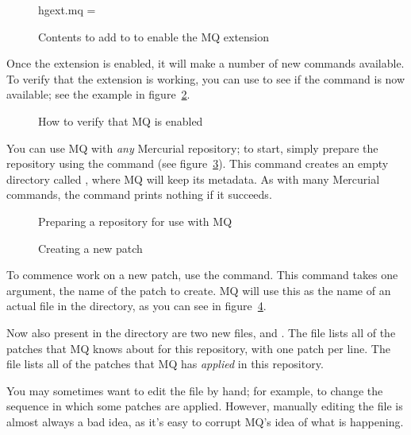 \begin{figure}[h]
  \begin{codesample4}
    [extensions]
    hgext.mq =
  \end{codesample4}
  \label{ex:mq:config}
  \caption{Contents to add to  to enable the MQ extension}
\end{figure}

Once the extension is enabled, it will make a number of new commands
available.  To verify that the extension is working, you can use
 to see if the  command is now available; see
the example in figure~\ref{ex:mq:enabled}.

\begin{figure}[h]
  \caption{How to verify that MQ is enabled}
  \label{ex:mq:enabled}
\end{figure}

You can use MQ with \emph{any} Mercurial repository; to start, simply
prepare the repository using the  command (see
figure~\ref{ex:mq:qinit}).  This command creates an empty directory
called , where MQ will keep its metadata.  As
with many Mercurial commands, the  command prints nothing
if it succeeds.

\begin{figure}[h]
  \caption{Preparing a repository for use with MQ}
  \label{ex:mq:qinit}
\end{figure}

\begin{figure}[h]
  \caption{Creating a new patch}
  \label{ex:mq:qnew}
\end{figure}

To commence work on a new patch, use the  command.  This
command takes one argument, the name of the patch to create.  MQ will
use this as the name of an actual file in the 
directory, as you can see in figure~\ref{ex:mq:qnew}.

Now also present in the  directory are two new
files,  and .  The 
file lists all of the patches that MQ knows about for this repository,
with one patch per line.  The  file lists all of the
patches that MQ has \emph{applied} in this repository.

\begin{note}
  You may sometimes want to edit the  file by hand;
  for example, to change the sequence in which some patches are
  applied.  However, manually editing the  file is
  almost always a bad idea, as it's easy to corrupt MQ's idea of what
  is happening.
\end{note}


